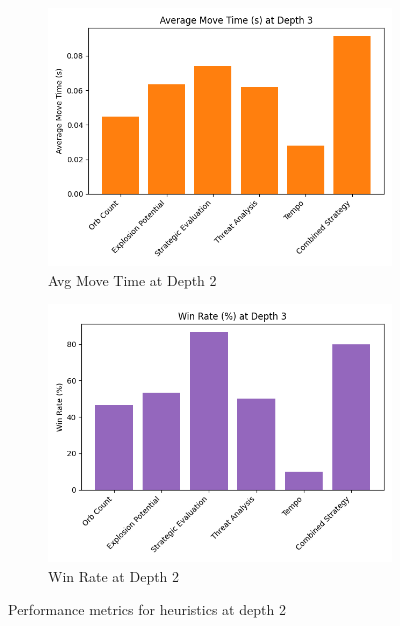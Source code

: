 \documentclass[12pt]{article}
\begin{document}
\begin{figure}[ht]
  \centering
  \begin{subfigure}[b]{0.45\textwidth}
    \includegraphics[width=\textwidth]{depth3_move_time.png}
    \caption{Avg Move Time at Depth 2}
    \label{fig:move2}
  \end{subfigure}
  \hfill
  \begin{subfigure}[b]{0.45\textwidth}
    \includegraphics[width=\textwidth]{depth3_win_rate.png}
    \caption{Win Rate at Depth 2}
    \label{fig:win2}
  \end{subfigure}
  \caption{Performance metrics for heuristics at depth 2}
  \label{fig:perf2}
\end{figure}
\end{document}
